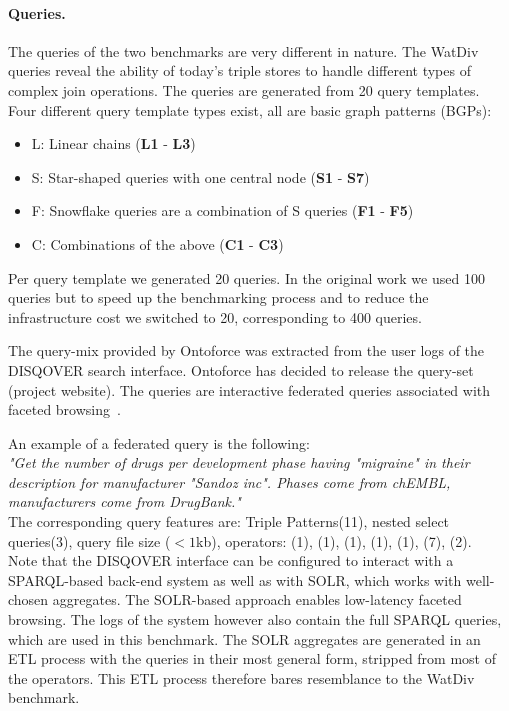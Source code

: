 \paragraph{Queries.} 
The queries of the two benchmarks are very different in nature. 
The WatDiv queries reveal the ability of today's triple stores to handle different types of complex join operations.
The queries are generated from 20 query templates. Four different query template types exist, all are basic graph patterns (BGPs): 
\begin{itemize}
	\item L: Linear chains (\textbf{L1} - \textbf{L3})
	\item S: Star-shaped queries with one central node (\textbf{S1} - \textbf{S7})
	\item F: Snowflake queries are a combination of S queries (\textbf{F1} - \textbf{F5})
	\item C: Combinations of the above (\textbf{C1} - \textbf{C3})
\end{itemize}
Per query template we generated 20 queries. In the original work we used 100 queries but to speed up the benchmarking process and to reduce the infrastructure cost we switched to 20, corresponding to 400 queries.

The query-mix provided by Ontoforce was extracted from the user logs of the DISQOVER search interface. Ontoforce has decided to release the query-set (project website).
The queries are interactive federated queries associated with faceted browsing~\cite{Ferre, Oren}.

An example of a federated query is the following: \\

\textit{"Get the number of drugs per development phase having "migraine"
in their description for manufacturer "Sandoz inc". Phases come
from chEMBL, manufacturers come from DrugBank."} \\

The corresponding query features are: Triple Patterns(11), nested select queries(3), query file size ($<1$kb), operators: (1), (1), (1), (1), (1), (7), (2).  \\

Note that the DISQOVER interface can be configured to interact with a SPARQL-based back-end system as well as with SOLR, which works with well-chosen aggregates. The SOLR-based approach enables low-latency faceted browsing. The logs of the system however also contain the full SPARQL queries, which are used in this benchmark. 
The SOLR aggregates are generated in an ETL process with the queries in their most general form, stripped from most of the operators. This ETL process therefore bares resemblance to the WatDiv benchmark.


